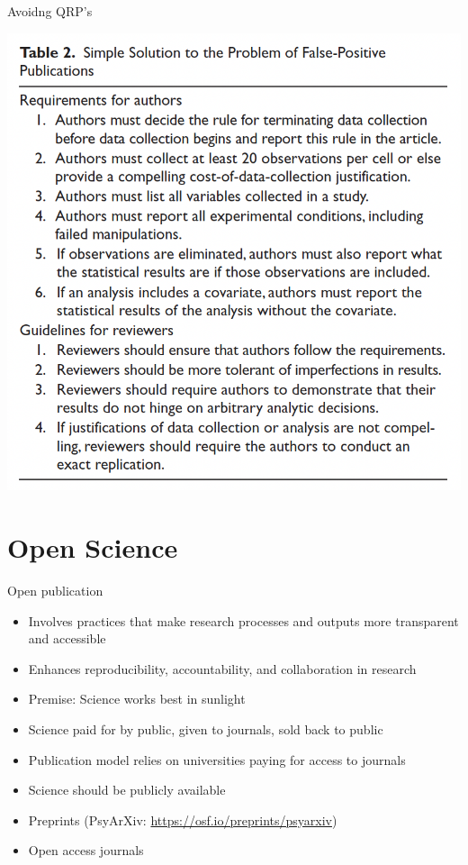 \documentclass[
  ignorenonframetext,
  aspectratio=169,
]{beamer}
\providecommand{\tightlist}{%
  \setlength{\itemsep}{0pt}\setlength{\parskip}{0pt}}\usepackage{longtable,booktabs,array}
\begin{document}
\begin{frame}{Avoidng QRP's}
\label{avoidng-qrps}
\begin{center}
\includegraphics{figs/avoid-qrp.png}
\end{center}
\end{frame}

\section{Open Science}\label{open-science}

\begin{frame}{Open publication}
\label{open-publication}
\begin{itemize}[<+->]
\tightlist
\item
  Involves practices that make research processes and outputs more
  transparent and accessible
\item
  Enhances reproducibility, accountability, and collaboration in
  research
\item
  Premise: Science works best in sunlight
\item
  Science paid for by public, given to journals, sold back to public
\item
  Publication model relies on universities paying for access to journals
\item
  Science should be publicly available
\item
  Preprints (PsyArXiv: \url{https://osf.io/preprints/psyarxiv})
\item
  Open access journals
\end{itemize}
\end{frame}
\end{document}
